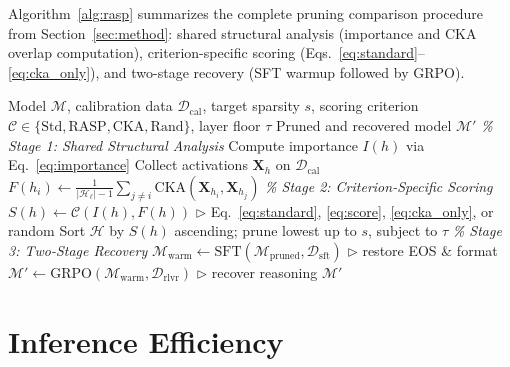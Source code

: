 Algorithm~\ref{alg:rasp} summarizes the complete pruning comparison procedure from Section~\ref{sec:method}: shared structural analysis (importance and CKA overlap computation), criterion-specific scoring (Eqs.~\ref{eq:standard}--\ref{eq:cka_only}), and two-stage recovery (SFT warmup followed by GRPO).

\begin{algorithm}[h]
\caption{Controlled Pruning Comparison Framework}
\label{alg:rasp}
\begin{algorithmic}[1]
\Require Model $\mathcal{M}$, calibration data $\mathcal{D}_\text{cal}$, target sparsity $s$, scoring criterion $\mathcal{C} \in \{\text{Std}, \text{RASP}, \text{CKA}, \text{Rand}\}$, layer floor $\tau$
\Ensure Pruned and recovered model $\mathcal{M}'$
\Statex \textit{\% Stage 1: Shared Structural Analysis}
    \State Compute importance $I(h)$ via Eq.~\eqref{eq:importance}
    \State Collect activations $\mathbf{X}_h$ on $\mathcal{D}_\text{cal}$
\EndFor
{}
        \State $F(h_i) \gets \frac{1}{|\mathcal{H}_\ell|-1} \sum_{j \neq i} \text{CKA}(\mathbf{X}_{h_i}, \mathbf{X}_{h_j})$
    \EndFor
\EndFor
\Statex \textit{\% Stage 2: Criterion-Specific Scoring}
    \State $S(h) \gets \mathcal{C}(I(h), F(h))$ \hfill $\triangleright$ Eq.~\ref{eq:standard}, \ref{eq:score}, \ref{eq:cka_only}, or random
\EndFor
\State Sort $\mathcal{H}$ by $S(h)$ ascending; prune lowest up to $s$, subject to $\tau$
\Statex \textit{\% Stage 3: Two-Stage Recovery}
\State $\mathcal{M}_\text{warm} \gets \text{SFT}(\mathcal{M}_\text{pruned}, \mathcal{D}_\text{sft})$ \hfill $\triangleright$ restore EOS \& format
\State $\mathcal{M}' \gets \text{GRPO}(\mathcal{M}_\text{warm}, \mathcal{D}_\text{rlvr})$ \hfill $\triangleright$ recover reasoning
\State \Return $\mathcal{M}'$
\end{algorithmic}
\end{algorithm}

\section{Inference Efficiency}
\label{sec:appendix_inference}


